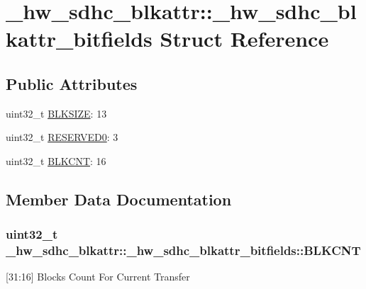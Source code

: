 \hypertarget{struct__hw__sdhc__blkattr_1_1__hw__sdhc__blkattr__bitfields}{}\section{\+\_\+hw\+\_\+sdhc\+\_\+blkattr\+:\+:\+\_\+hw\+\_\+sdhc\+\_\+blkattr\+\_\+bitfields Struct Reference}
\label{struct__hw__sdhc__blkattr_1_1__hw__sdhc__blkattr__bitfields}
\subsection*{Public Attributes}
\begin{DoxyCompactItemize}
\item 
uint32\+\_\+t \hyperlink{struct__hw__sdhc__blkattr_1_1__hw__sdhc__blkattr__bitfields_a609dd8d372c2a813cd26a783ebe79d18}{B\+L\+K\+S\+I\+ZE}\+: 13
\item 
uint32\+\_\+t \hyperlink{struct__hw__sdhc__blkattr_1_1__hw__sdhc__blkattr__bitfields_a4d4523e8fc6131cff737460a23778bca}{R\+E\+S\+E\+R\+V\+E\+D0}\+: 3
\item 
uint32\+\_\+t \hyperlink{struct__hw__sdhc__blkattr_1_1__hw__sdhc__blkattr__bitfields_ace06f3588bad8e951fedad95d6a19e67}{B\+L\+K\+C\+NT}\+: 16
\end{DoxyCompactItemize}


\subsection{Member Data Documentation}
\subsubsection[{\texorpdfstring{B\+L\+K\+C\+NT}{BLKCNT}}]{\setlength{\rightskip}{0pt plus 5cm}uint32\+\_\+t \+\_\+hw\+\_\+sdhc\+\_\+blkattr\+::\+\_\+hw\+\_\+sdhc\+\_\+blkattr\+\_\+bitfields\+::\+B\+L\+K\+C\+NT}\hypertarget{struct__hw__sdhc__blkattr_1_1__hw__sdhc__blkattr__bitfields_ace06f3588bad8e951fedad95d6a19e67}{}\label{struct__hw__sdhc__blkattr_1_1__hw__sdhc__blkattr__bitfields_ace06f3588bad8e951fedad95d6a19e67}
\mbox{[}31\+:16\mbox{]} Blocks Count For Current Transfer 
